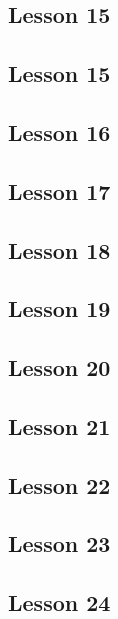 \documentclass[a4paper,11pt]{article}
\begin{document}
\subsection{Lesson 15}


\subsection{Lesson 15}


\subsection{Lesson 16}


\subsection{Lesson 17}


\subsection{Lesson 18}


\subsection{Lesson 19}


\subsection{Lesson 20}


\subsection{Lesson 21}


\subsection{Lesson 22}


\subsection{Lesson 23}


\subsection{Lesson 24}
\end{document}
